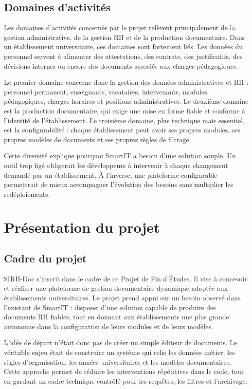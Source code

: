 \subsection{Domaines d'activités}

Les domaines d'activités concernés par le projet relèvent principalement de la gestion administrative, de la gestion RH et de la production documentaire. Dans un établissement universitaire, ces domaines sont fortement liés. Les données du personnel servent à alimenter des attestations, des contrats, des justificatifs, des décisions internes ou encore des documents associés aux charges pédagogiques.

Le premier domaine concerne donc la gestion des données administratives et RH : personnel permanent, enseignants, vacataires, intervenants, modules pédagogiques, charges horaires et positions administratives. Le deuxième domaine est la production documentaire, qui exige une mise en forme fiable et conforme à l'identité de l'établissement. Le troisième domaine, plus technique mais essentiel, est la configurabilité : chaque établissement peut avoir ses propres modules, ses propres modèles de documents et ses propres règles de filtrage.

Cette diversité explique pourquoi SmartIT a besoin d'une solution souple. Un outil trop figé obligerait les développeurs à intervenir à chaque changement demandé par un établissement. À l'inverse, une plateforme configurable permettrait de mieux accompagner l'évolution des besoins sans multiplier les redéploiements.

\section{Présentation du projet}

\subsection{Cadre du projet}

SIRH-Doc s'inscrit dans le cadre de ce Projet de Fin d'Études. Il vise à concevoir et réaliser une plateforme de gestion documentaire dynamique adaptée aux établissements universitaires. Le projet prend appui sur un besoin observé dans l'existant de SmartIT : disposer d'une solution capable de produire des documents RH fiables, tout en donnant aux établissements une plus grande autonomie dans la configuration de leurs modules et de leurs modèles.

L'idée de départ n'était donc pas de créer un simple éditeur de documents. Le véritable enjeu était de construire un système qui relie les données métier, les règles d'organisation, les années universitaires et les modèles documentaires. Cette approche permet de réduire les interventions répétitives dans le code, tout en gardant un cadre technique contrôlé pour les requêtes, les filtres et l'archivage.

